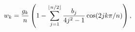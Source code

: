 \[w_{k}=\frac{g_{k}}{n}\left(1-\sum_{j=1}^{\left\lfloor n/2\right\rfloor}\frac{b%
_{j}}{4j^{2}-1}\mathop{\cos\/}\nolimits\!\left(2jk\pi/n\right)\right),\]